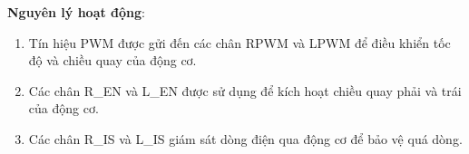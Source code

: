             \textbf{Nguyên lý hoạt động}:
            \begin{enumerate}
                \item Tín hiệu PWM được gửi đến các chân RPWM và LPWM để điều khiển tốc độ và chiều quay của động cơ.
                \item Các chân R\_EN và L\_EN được sử dụng để kích hoạt chiều quay phải và trái của động cơ.
                \item Các chân R\_IS và L\_IS giám sát dòng điện qua động cơ để bảo vệ quá dòng.
            \end{enumerate}
            \cleardoublepage